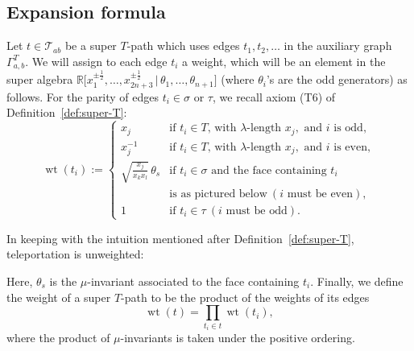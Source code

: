 \documentclass[11pt]{article}
\numberwithin{equation}{section}
\numberwithin{equation}{section}
\DeclareMathOperator{\wt}{wt}
\begin{document}
\subsection{Expansion formula}

\begin{Definition}[weight] \label{def:weight}\rm
 Let $t \in \mathcal{T}_{ab}$ be a super $T$-path which uses edges $t_1,t_2,\dots$ in the auxiliary graph $\Gamma^T_{a,b}$.
 We will assign to each edge $t_i$ a weight, which will be an element in the super algebra
 $\mathbb R\bigl[x_1^{\pm\frac{1}{2}},\dots,x_{2n+3}^{\pm\frac{1}{2}} \,|\, \theta_1,\dots,\theta_{n+1}\bigr]$ (where $\theta_i$'s are the odd generators) as follows.
 For the parity of edges $t_i \in \sigma$ or $\tau$, we recall axiom (T6) of Definition~\ref{def:super-T}:
 \[
 \wt(t_i) := \begin{cases}
 x_j &\text{if } t_i \in T \text{, with }\lambda\text{-length }x_j, \text{ and }i \text{ is odd}, \\
 x_j^{-1} &\text{if } t_i \in T \text{, with }\lambda\text{-length }x_j, \text{ and }i \text{ is even}, \\
 \sqrt{\frac{x_j}{x_kx_l}} \, \theta_s &\text{if } t_i \in\sigma \text{ and the face containing }t_i \\
 & \text{is as pictured below} ~ (i \text{ must be even}), \\
 1&\text{if }t_i\in\tau~ (i \text{ must be odd}).
 \end{cases} \]

 In keeping with the intuition mentioned after Definition~\ref{def:super-T}, teleportation is unweighted:
 \begin{center}
 \end{center}
 Here, $\theta_s$ is the $\mu$-invariant associated to the face containing $t_i$.
	Finally, we define the weight of a super $T$-path to be the product of the weights of its edges
 \[\wt(t)=\prod_{t_i\in t}\wt(t_i),\]
 where the product of $\mu$-invariants is taken under the positive ordering.
\end{Definition}
\end{document}

